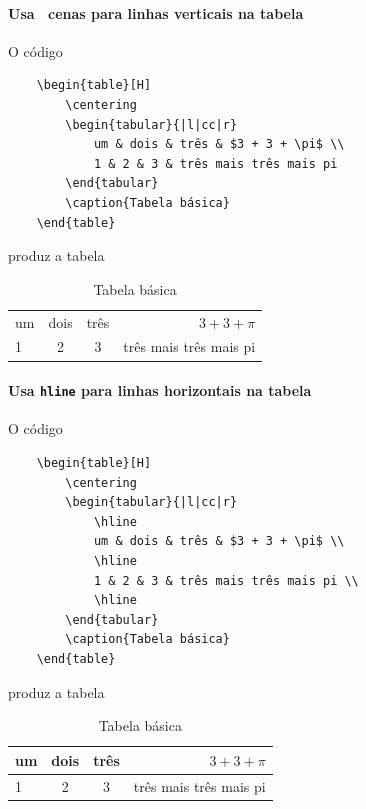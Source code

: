 \documentclass[11pt]{article}
\begin{document}
\paragraph{Usa \textbar~cenas para linhas verticais na tabela}
O código
\begin{verbatim}
    \begin{table}[H]
        \centering
        \begin{tabular}{|l|cc|r}
            um & dois & três & $3 + 3 + \pi$ \\
            1 & 2 & 3 & três mais três mais pi
        \end{tabular}
        \caption{Tabela básica}
    \end{table}
\end{verbatim}
produz a tabela
\begin{table}[H]
    \centering
    \begin{tabular}{|l|cc|r}
        um & dois & três & $3 + 3 + \pi$ \\
        1 & 2 & 3 & três mais três mais pi
    \end{tabular}
    \caption{Tabela básica}
\end{table}

\paragraph{Usa \texttt{hline} para linhas horizontais na tabela}
O código
\begin{verbatim}
    \begin{table}[H]
        \centering
        \begin{tabular}{|l|cc|r}
            \hline
            um & dois & três & $3 + 3 + \pi$ \\
            \hline
            1 & 2 & 3 & três mais três mais pi \\
            \hline
        \end{tabular}
        \caption{Tabela básica}
    \end{table}
\end{verbatim}
produz a tabela
\begin{table}[H]
    \centering
    \begin{tabular}{|l|cc|r}
        \hline
        um & dois & três & $3 + 3 + \pi$ \\
        \hline
        1 & 2 & 3 & três mais três mais pi \\
        \hline
    \end{tabular}
    \caption{Tabela básica}
\end{table}
\end{document}
